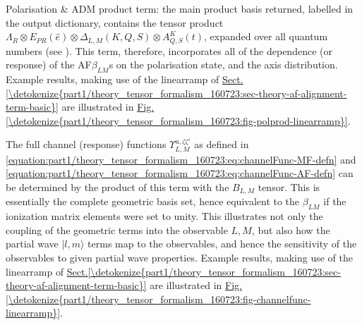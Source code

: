 \documentclass[letterpaper,table,10pt,english]{jupyterBook}
\begin{document}
\sphinxAtStartPar
Polarisation \& ADM product term: the main product basis returned, labelled  in the output dictionary, contains the tensor product \(\Lambda_{R}\otimes E_{PR}(\hat{e})\otimes \Delta_{L,M}(K,Q,S)\otimes A^{K}_{Q,S}(t)\), expanded over all quantum numbers (see ). This term, therefore, incorporates all of the dependence (or response) of the AF\sphinxhyphen{}\(\beta_{LM}\)s on the polarisation state, and the axis distribution. Example results, making use of the linear\sphinxhyphen{}ramp {\hyperref[\detokenize{backmatter/glossary:term-ADMs}]{}} of \hyperref[\detokenize{part1/theory_tensor_formalism_160723:sec-theory-af-alignment-term-basic}]{Sect.\@ \ref{\detokenize{part1/theory_tensor_formalism_160723:sec-theory-af-alignment-term-basic}}} are illustrated in \hyperref[\detokenize{part1/theory_tensor_formalism_160723:fig-polprod-linearramp}]{Fig.\@ \ref{\detokenize{part1/theory_tensor_formalism_160723:fig-polprod-linearramp}}}.

\sphinxAtStartPar
The full channel (response) functions \(\varUpsilon_{L,M}^{u,\zeta\zeta'}\) as defined in \eqref{equation:part1/theory_tensor_formalism_160723:eq:channelFunc-MF-defn} and \eqref{equation:part1/theory_tensor_formalism_160723:eq:channelFunc-AF-defn} can be determined by the product of this term with the \(B_{L,M}\) tensor. This is essentially the complete geometric basis set, hence equivalent to the {\hyperref[\detokenize{backmatter/glossary:term-AF}]{}}\sphinxhyphen{}\(\beta_{LM}\) if the ionization matrix elements were set to unity. This illustrates not only the coupling of the geometric terms into the observable \(L,M\), but also how the partial wave \(|l,m\rangle\) terms map to the observables, and hence the sensitivity of the observables to given partial wave properties. Example results, making use of the linear\sphinxhyphen{}ramp {\hyperref[\detokenize{backmatter/glossary:term-ADMs}]{}} of \hyperref[\detokenize{part1/theory_tensor_formalism_160723:sec-theory-af-alignment-term-basic}]{Sect.\@ \ref{\detokenize{part1/theory_tensor_formalism_160723:sec-theory-af-alignment-term-basic}}} are illustrated in \hyperref[\detokenize{part1/theory_tensor_formalism_160723:fig-channelfunc-linearramp}]{Fig.\@ \ref{\detokenize{part1/theory_tensor_formalism_160723:fig-channelfunc-linearramp}}}.
\end{document}
